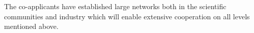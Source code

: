 \documentclass[12pt]{article}
\begin{document}
The co-applicants have established large networks both in the scientific communities and industry which will enable extensive cooperation on all levels mentioned above.
%
%
%
%
%
\end{document}
